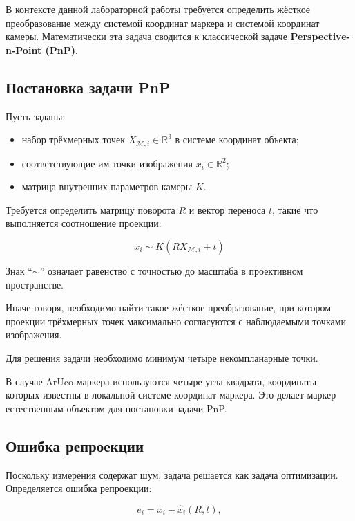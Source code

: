 \documentclass[a4paper,12pt]{article}
\begin{document}
В контексте данной лабораторной работы требуется определить жёсткое преобразование между системой координат маркера и системой координат камеры. Математически эта задача сводится к классической задаче \textbf{Perspective-n-Point (PnP)}.

\subsection*{Постановка задачи PnP}

Пусть заданы:

\begin{itemize}
    \item набор трёхмерных точек $X_{\mathcal{M},i} \in \mathbb{R}^3$ в системе координат объекта;
    \item соответствующие им точки изображения $x_i \in \mathbb{R}^2$;
    \item матрица внутренних параметров камеры $K$.
\end{itemize}

Требуется определить матрицу поворота $R$ и вектор переноса $t$, такие что выполняется соотношение проекции:

\begin{equation}
x_i \sim K (R X_{\mathcal{M},i} + t)
\label{eq:pnp}
\end{equation}

Знак ``$\sim$'' означает равенство с точностью до масштаба в проективном пространстве.

Иначе говоря, необходимо найти такое жёсткое преобразование, при котором проекции трёхмерных точек максимально согласуются с наблюдаемыми точками изображения.

Для решения задачи необходимо минимум четыре некомпланарные точки.

В случае ArUco-маркера используются четыре угла квадрата, координаты которых известны в локальной системе координат маркера. Это делает маркер естественным объектом для постановки задачи PnP.

\subsection*{Ошибка репроекции}

Поскольку измерения содержат шум, задача решается как задача оптимизации. Определяется ошибка репроекции:

\begin{equation}
e_i = x_i - \hat{x}_i(R,t),
\end{equation}
\end{document}
